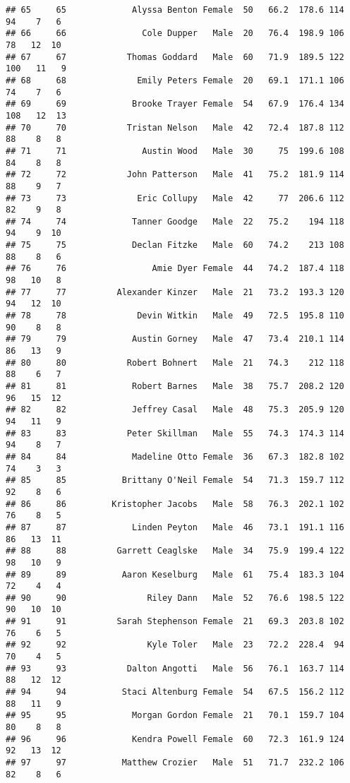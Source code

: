 \documentclass[
]{article}
\begin{document}
\begin{verbatim}
## 65     65             Alyssa Benton Female  50   66.2  178.6 114  94    7   6
## 66     66               Cole Dupper   Male  20   76.4  198.9 106  78   12  10
## 67     67            Thomas Goddard   Male  60   71.9  189.5 122 100   11   9
## 68     68              Emily Peters Female  20   69.1  171.1 106  74    7   6
## 69     69             Brooke Trayer Female  54   67.9  176.4 134 108   12  13
## 70     70            Tristan Nelson   Male  42   72.4  187.8 112  88    8   8
## 71     71               Austin Wood   Male  30     75  199.6 108  84    8   8
## 72     72            John Patterson   Male  41   75.2  181.9 114  88    9   7
## 73     73              Eric Collupy   Male  42     77  206.6 112  82    9   8
## 74     74             Tanner Goodge   Male  22   75.2    194 118  94    9  10
## 75     75             Declan Fitzke   Male  60   74.2    213 108  88    8   6
## 76     76                 Amie Dyer Female  44   74.2  187.4 118  98   10   8
## 77     77          Alexander Kinzer   Male  21   73.2  193.3 120  94   12  10
## 78     78              Devin Witkin   Male  49   72.5  195.8 110  90    8   8
## 79     79             Austin Gorney   Male  47   73.4  210.1 114  86   13   9
## 80     80            Robert Bohnert   Male  21   74.3    212 118  88    6   7
## 81     81             Robert Barnes   Male  38   75.7  208.2 120  96   15  12
## 82     82             Jeffrey Casal   Male  48   75.3  205.9 120  94   11   9
## 83     83            Peter Skillman   Male  55   74.3  174.3 114  94    8   7
## 84     84             Madeline Otto Female  36   67.3  182.8 102  74    3   3
## 85     85           Brittany O'Neil Female  54   71.3  159.7 112  92    8   6
## 86     86         Kristopher Jacobs   Male  58   76.3  202.1 102  76    8   5
## 87     87             Linden Peyton   Male  46   73.1  191.1 116  86   13  11
## 88     88          Garrett Ceaglske   Male  34   75.9  199.4 122  98   10   9
## 89     89           Aaron Keselburg   Male  61   75.4  183.3 104  72    4   4
## 90     90                Riley Dann   Male  52   76.6  198.5 122  90   10  10
## 91     91          Sarah Stephenson Female  21   69.3  203.8 102  76    6   5
## 92     92                Kyle Toler   Male  23   72.2  228.4  94  70    4   5
## 93     93            Dalton Angotti   Male  56   76.1  163.7 114  88   12  12
## 94     94           Staci Altenburg Female  54   67.5  156.2 112  88   11   9
## 95     95             Morgan Gordon Female  21   70.1  159.7 104  80    8   8
## 96     96             Kendra Powell Female  60   72.3  161.9 124  92   13  12
## 97     97           Matthew Crozier   Male  51   71.7  232.2 106  82    8   6

\end{verbatim}
\end{document}
